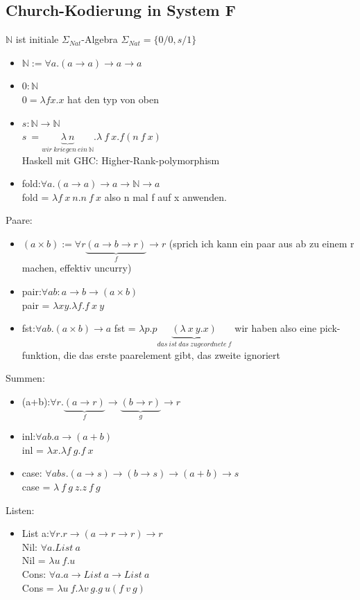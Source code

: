 \documentclass{article}
\theoremstyle{definition}
\begin{document}
	\subsection{Church-Kodierung in System F}
	$\mathbb{N}$ ist initiale $\Sigma_{Nat}$-Algebra $\Sigma_{Nat} =\{0/0,s/1\}$\\
	\begin{itemize}
		\item $\mathbb{N}:=\forall a.(a\to a)\to a\to a$
		\item $0:\mathbb{N}$\\
		 $0=\lambda fx.x$ hat den typ von oben\\
		\item $s:\mathbb{N}\to \mathbb{N}$\\
		$s\ = \underbrace{\lambda\ n}_{wir\ kriegen\ ein\ \mathbb{N}}.\lambda\ f\ x.f(n\ f\ x)$\\
		Haskell mit GHC: Higher-Rank-polymorphism
		\item fold:$\forall a.(a\to a)\to a\to \mathbb{N}\to a$\\
		fold = $\lambda f\ x\ n.n\ f\ x$ also n mal f auf x anwenden.
	\end{itemize}
	Paare:
	\begin{itemize}
		\item $(a\times b):=\forall r\underbrace{(a\to b\to r)}_{f}\to r$ (sprich ich kann ein paar aus ab zu einem r machen, effektiv uncurry)
		\item pair:$\forall ab: a\to b\to( a\times b)$\\
		pair = $\lambda x y.\lambda f.f\ x\ y$
		\item fst:$\forall ab. (a\times b)\to a$
		fst = $\lambda p.p\underbrace{(\lambda\ x\ y.x)}_{das\ ist\ das\ zugeordnete\ f}$ wir haben also eine pick-funktion, die das erste paarelement gibt, das zweite ignoriert
	\end{itemize}
	Summen:
	\begin{itemize}
	 \item (a+b):$\forall r.\underbrace{(a\to r)}_{f}\to \underbrace{(b\to r)}_{g}\to r$
	 \item inl:$\forall ab.a\to (a+b)$\\
	 inl = $\lambda x.\lambda f\ g. f\ x$\\
	 \item case: $\forall abs. (a\to s)\to (b\to s)\to (a+b)\to s$\\
	 case = $\lambda\ f\ g\ z.z\ f\ g$
	\end{itemize}
	Listen:
	\begin{itemize}
		\item List a:$\forall r.r\to (a\to r\to r)\to r$\\
		Nil: $\forall a. List\ a$\\
		Nil = $\lambda u\ f. u$\\
		Cons: $\forall a. a\to List\ a\to List\ a$\\
		Cons = $\lambda u\ f. \lambda v\ g.g\ u(f\ v\ g)$
	\end{itemize}
\end{document}

